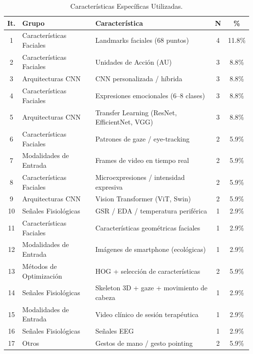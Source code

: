\documentclass[ASNA,twocolumn]{USG}
\begin{document}
	\begin{table}[!t]
		\centering
		\caption{Características Específicas Utilizadas.\label{tab11}}
		{\setlength{\tabcolsep}{4pt}
			\begin{tabular*}{\textwidth}{@{\extracolsep\fill}cllcc@{\extracolsep\fill}}
				\toprule
				\textbf{It.} & \textbf{Grupo} & \textbf{Característica} & \textbf{N} & \textbf{\%} \\
				\midrule
				1  & Características Faciales  & Landmarks faciales (68 puntos)           & 4 & 11.8\% \\
				2  & Características Faciales  & Unidades de Acción (AU)                  & 3 & 8.8\%  \\
				3  & Arquitecturas CNN         & CNN personalizada / híbrida              & 3 & 8.8\%  \\
				4  & Características Faciales  & Expresiones emocionales (6--8 clases)    & 3 & 8.8\%  \\
				5  & Arquitecturas CNN         & Transfer Learning (ResNet, EfficientNet, VGG) & 3 & 8.8\% \\
				6  & Características Faciales  & Patrones de gaze / eye-tracking          & 2 & 5.9\%  \\
				7  & Modalidades de Entrada    & Frames de video en tiempo real           & 2 & 5.9\%  \\
				8  & Características Faciales  & Microexpresiones / intensidad expresiva  & 2 & 5.9\%  \\
				9  & Arquitecturas CNN         & Vision Transformer (ViT, Swin)           & 2 & 5.9\%  \\
				10 & Señales Fisiológicas      & GSR / EDA / temperatura periférica       & 1 & 2.9\%  \\
				11 & Características Faciales  & Características geométricas faciales     & 1 & 2.9\%  \\
				12 & Modalidades de Entrada    & Imágenes de smartphone (ecológicas)      & 1 & 2.9\%  \\
				13 & Métodos de Optimización   & HOG + selección de características       & 2 & 5.9\%  \\
				14 & Señales Fisiológicas      & Skeleton 3D + gaze + movimiento de cabeza & 1 & 2.9\% \\
				15 & Modalidades de Entrada    & Video clínico de sesión terapéutica      & 1 & 2.9\%  \\
				16 & Señales Fisiológicas      & Señales EEG                              & 1 & 2.9\%  \\
				17 & Otros                     & Gestos de mano / gesto pointing          & 2 & 5.9\%  \\

\end{tabular*}}
\end{table}
\end{document}
